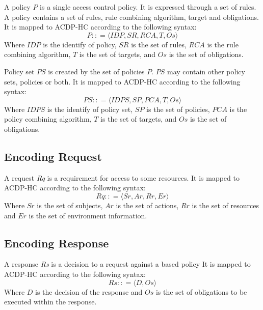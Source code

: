 A policy $P$ is a single access control policy. 
It is expressed through a set of rules. 
A policy contains a set of rules, rule combining algorithm, target and obligations.
It is mapped to ACDP-HC according to the following syntax:
\begin{equation}
	\textit{$P::$}= \textit{$\langle IDP, SR, RCA, T, Os \rangle$}
\end{equation}
Where $IDP$ is the identify of policy, $SR$ is the set of rules, $RCA$ is the rule combining algorithm, $T$ is the set of targets, and $Os$ is the set of obligations.

Policy set $PS$ is created by the set of policies $P$. $PS$ may contain other policy sets, policies or both. 
It is mapped to ACDP-HC according to the following syntax:
\begin{equation}
	\textit{$PS::$}= \textit{$\langle IDPS, SP, PCA, T, Os \rangle$}
\end{equation}		
Where $IDPS$ is the identify of policy set, $SP$ is the set of policies, $PCA$ is the policy combining algorithm, $T$ is the set of targets, and $Os$ is the set of obligations.

\subsection{Encoding Request}\label{Back:request}

A request \textit{Rq} is a requirement for access to some resources. It is mapped to ACDP-HC according to the following syntax:
\begin{equation}
	\textit{$Rq::$}= \textit{$\langle Sr, Ar, Rr, Er \rangle$}
\end{equation}
Where $Sr$ is the set of subjects, $Ar$ is the set of actions, $Rr$ is the set of resources and $Er$ is the set of environment information.

\subsection{Encoding Response}\label{Back:response}

A response \textit{Rs} is a decision to a request against a based policy 
It is mapped to ACDP-HC according to the following syntax:
\begin{equation}
	\textit{$Rs::$}= \textit{$\langle D, Os \rangle$}
\end{equation}
Where $D$ is the decision of the response and $Os$ is the set of obligations to be executed within the response. 

